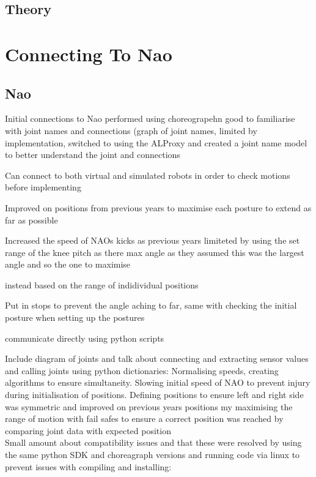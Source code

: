 \documentclass[11pt]{article}
\begin{document}
\subsection{Theory}

\section{Connecting To Nao}

\subsection{Nao}
Initial connections to Nao performed using choreograpehn good to familiarise with joint names and connections (graph of joint names, limited by implementation, switched to using the ALProxy and created a joint name model to better understand the joint and connections

Can connect to both virtual and simulated robots in order to check motions before implementing 

Improved on positions from previous years to maximise each posture to extend as far as possible 

Increased the speed of NAOs kicks as previous years limiteted by using the set range of the knee pitch as there max angle as they  assumed this was the largest angle and so the one to maximise

instead based on the range of indidividual positions 

Put in stops to prevent the angle aching to far, same with checking the initial posture when setting up the postures

communicate directly using python scripts


Include diagram of joints and talk about connecting and extracting sensor values and calling joints using python dictionaries:
Normalising speeds, creating algorithms to ensure simultaneity.
Slowing initial speed of NAO to prevent injury during initialisation of positions.
Defining positions to ensure left and right side was symmetric and improved on previous years positions my maximising the range of motion with fail safes to ensure a correct position was reached by comparing joint data with expected position\\

Small amount about compatibility issues and that these were resolved by using the same python SDK and choreagraph versions and running code via linux to prevent issues with compiling and installing: 
\end{document}
